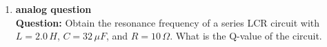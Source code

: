 \documentclass{article}
\begin{document}
\begin{enumerate}


\item \textbf{analog question}\\
\textbf{Question:} 
Obtain the resonance frequency of a series LCR circuit with $L = 2.0\, H$, $C = 32\, \mu F$, and $R = 10\, \Omega$. What is the Q-value of the circuit.\\
\end{enumerate}
\end{document}
